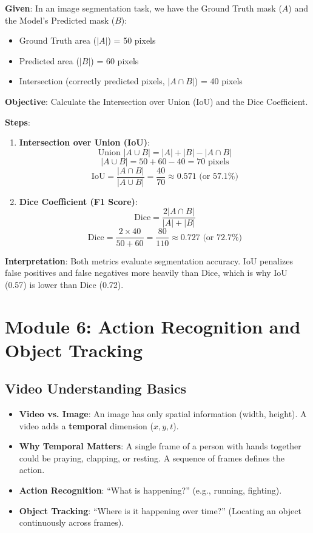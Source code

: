 \documentclass[11pt,a4paper]{article}
\begin{document}
\vspace{1em}

\begin{tcolorbox}[colback=gray!5!white,colframe=black!75!black,title=\textbf{Worked Example 15: IoU and Dice Coefficient}]
\textbf{Given}:
In an image segmentation task, we have the Ground Truth mask ($A$) and the Model's Predicted mask ($B$):
\begin{itemize}
    \item Ground Truth area ($|A|$) = 50 pixels
    \item Predicted area ($|B|$) = 60 pixels
    \item Intersection (correctly predicted pixels, $|A \cap B|$) = 40 pixels
\end{itemize}

\textbf{Objective}: Calculate the Intersection over Union (IoU) and the Dice Coefficient.

\textbf{Steps}:
\begin{enumerate}
    \item \textbf{Intersection over Union (IoU)}:
    \[ \text{Union } |A \cup B| = |A| + |B| - |A \cap B| \]
    \[ |A \cup B| = 50 + 60 - 40 = 70 \text{ pixels} \]
    \[ \text{IoU} = \frac{|A \cap B|}{|A \cup B|} = \frac{40}{70} \approx 0.571 \text{ (or 57.1\%)} \]

    \item \textbf{Dice Coefficient (F1 Score)}:
    \[ \text{Dice} = \frac{2 |A \cap B|}{|A| + |B|} \]
    \[ \text{Dice} = \frac{2 \times 40}{50 + 60} = \frac{80}{110} \approx 0.727 \text{ (or 72.7\%)} \]
\end{enumerate}

\textbf{Interpretation}: Both metrics evaluate segmentation accuracy. IoU penalizes false positives and false negatives more heavily than Dice, which is why IoU (0.57) is lower than Dice (0.72).
\end{tcolorbox}

\newpage

\section{Module 6: Action Recognition and Object Tracking}

\subsection{Video Understanding Basics}

\begin{itemize}
    \item \textbf{Video vs. Image}: An image has only spatial information (width, height). A video adds a \textbf{temporal} dimension ($x, y, t$).
    \item \textbf{Why Temporal Matters}: A single frame of a person with hands together could be praying, clapping, or resting. A sequence of frames defines the action.
    \item \textbf{Action Recognition}: ``What is happening?'' (e.g., running, fighting).
    \item \textbf{Object Tracking}: ``Where is it happening over time?'' (Locating an object continuously across frames).
\end{itemize}
\end{document}
